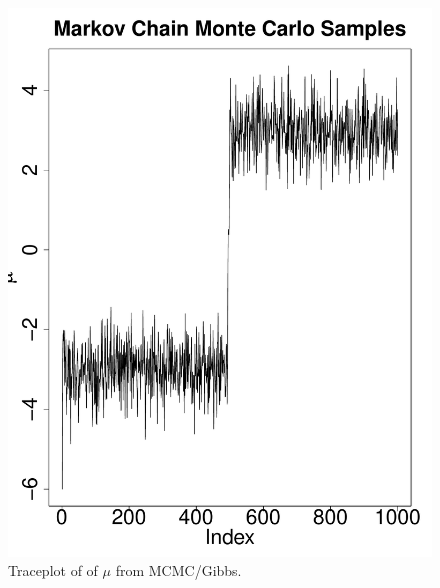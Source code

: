 \documentclass[11pt]{article}
\begin{document}
\begin{enumerate}
\begin{enumerate}
\begin{multicols}{2}
\begin{figure}[H]
\begin{center}
\includegraphics[scale=0.3]{figures/MCMCtrace}
\caption{\label{fig:MCMCtrace} Traceplot of of $\mu$ from MCMC/Gibbs.}
\end{center}
\end{figure}

\end{multicols}




\end{enumerate}
\end{enumerate}
\end{document}
